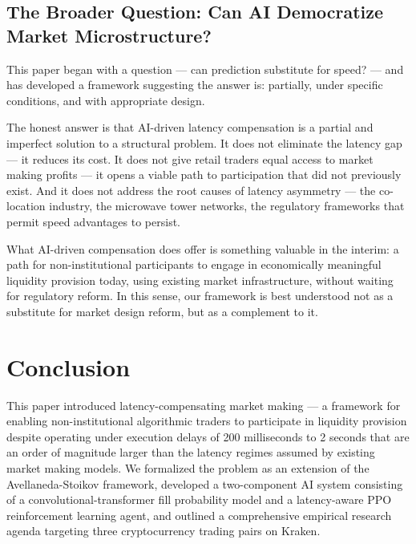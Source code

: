 \documentclass[12pt]{article}
\begin{document}
\subsection{The Broader Question: Can AI Democratize Market Microstructure?}

This paper began with a question --- can prediction substitute for speed? --- and has developed a framework suggesting the answer is: partially, under specific conditions, and with appropriate design.

The honest answer is that AI-driven latency compensation is a partial and imperfect solution to a structural problem. It does not eliminate the latency gap --- it reduces its cost. It does not give retail traders equal access to market making profits --- it opens a viable path to participation that did not previously exist. And it does not address the root causes of latency asymmetry --- the co-location industry, the microwave tower networks, the regulatory frameworks that permit speed advantages to persist.

What AI-driven compensation does offer is something valuable in the interim: a path for non-institutional participants to engage in economically meaningful liquidity provision today, using existing market infrastructure, without waiting for regulatory reform. In this sense, our framework is best understood not as a substitute for market design reform, but as a complement to it.

\section{Conclusion}
\label{sec:conclusion}

This paper introduced latency-compensating market making --- a framework for enabling non-institutional algorithmic traders to participate in liquidity provision despite operating under execution delays of 200 milliseconds to 2 seconds that are an order of magnitude larger than the latency regimes assumed by existing market making models. We formalized the problem as an extension of the Avellaneda-Stoikov framework, developed a two-component AI system consisting of a convolutional-transformer fill probability model and a latency-aware PPO reinforcement learning agent, and outlined a comprehensive empirical research agenda targeting three cryptocurrency trading pairs on Kraken.
\end{document}
